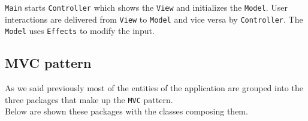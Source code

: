 \begin{center}
\end{center}

\texttt{Main} starts \texttt{Controller} which shows
the \texttt{View} and initializes the \texttt{Model}. User
interactions are delivered from \texttt{View} to
\texttt{Model} and vice versa by \texttt{Controller}. The
\texttt{Model} uses \texttt{Effects} to modify the input.

\newpage
\subsection{MVC pattern}  %

As we said previously most of the entities of the application are
grouped into the three packages that make up the \texttt{MVC} pattern.\\
Below are shown these packages with the classes composing them.

